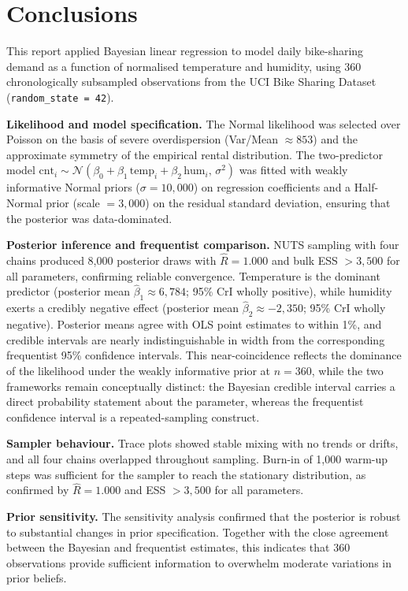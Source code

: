 \section{Conclusions}
\label{sec:conclusions}

This report applied Bayesian linear regression to model daily bike-sharing demand
as a function of normalised temperature and humidity, using 360 chronologically
subsampled observations from the UCI Bike Sharing Dataset
(\texttt{random\_state = 42}).

\textbf{Likelihood and model specification.} The Normal likelihood was selected
over Poisson on the basis of severe overdispersion (Var/Mean $\approx 853$) and
the approximate symmetry of the empirical rental distribution. The two-predictor
model $\text{cnt}_i \sim \mathcal{N}(\beta_0 + \beta_1\,\text{temp}_i +
\beta_2\,\text{hum}_i,\,\sigma^2)$ was fitted with weakly informative Normal
priors ($\sigma = 10{,}000$) on regression coefficients and a Half-Normal prior
(scale $= 3{,}000$) on the residual standard deviation, ensuring that the
posterior was data-dominated.

\textbf{Posterior inference and frequentist comparison.} NUTS sampling with four
chains produced 8{,}000 posterior draws with $\hat{R} = 1.000$ and bulk
ESS $> 3{,}500$ for all parameters, confirming reliable convergence. Temperature
is the dominant predictor (posterior mean $\hat{\beta}_1 \approx 6{,}784$;
95\% CrI wholly positive), while humidity exerts a credibly negative effect
(posterior mean $\hat{\beta}_2 \approx -2{,}350$; 95\% CrI wholly negative).
Posterior means agree with OLS point estimates to within 1\%, and credible
intervals are nearly indistinguishable in width from the corresponding
frequentist 95\% confidence intervals. This near-coincidence reflects the
dominance of the likelihood under the weakly informative prior at $n = 360$,
while the two frameworks remain conceptually distinct: the Bayesian credible
interval carries a direct probability statement about the parameter, whereas
the frequentist confidence interval is a repeated-sampling construct.

\textbf{Sampler behaviour.} Trace plots showed stable mixing with no trends
or drifts, and all four chains overlapped throughout sampling. Burn-in of
1{,}000 warm-up steps was sufficient for the sampler to reach the stationary
distribution, as confirmed by $\hat{R} = 1.000$ and ESS $> 3{,}500$ for all
parameters.

\textbf{Prior sensitivity.} The sensitivity analysis confirmed that the posterior
is robust to substantial changes in prior specification. Together with the close
agreement between the Bayesian and frequentist estimates, this indicates that
360 observations provide sufficient information to overwhelm moderate variations
in prior beliefs.

